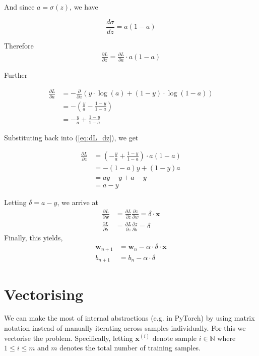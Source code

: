 \documentclass[varwidth,border=2cm]{standalone}
\begin{document}
And since $a = \sigma(z)$, we have

\begin{equation}
\frac{d\sigma}{dz} = a(1 - a) \nonumber
\end{equation}

Therefore
\begin{align}
\frac{\partial L}{\partial z} = \frac{\partial L}{\partial a} \cdot a(1-a)
\label{eq:dL_dz}
\end{align}

Further

\begin{align}
\frac{\partial L}{\partial a} &= - \frac{\partial}{\partial a} \left(y \cdot \log(a) + (1-y) \cdot \log(1-a)\right) \nonumber \\
 &= - \left( \frac{y}{a} - \frac{1-y}{1-a} \right) \nonumber \\
 &= -\frac{y}{a} + \frac{1-y}{1-a} \nonumber
\end{align}

Substituting back into (\ref{eq:dL_dz}), we get

\begin{align}
\frac{\partial L}{\partial z} &= \left( -\frac{y}{a} + \frac{1-y}{1-a} \right) \cdot a(1-a) \\
 &= -(1-a)y + (1-y)a \nonumber \\
 &= ay - y + a - y \nonumber \\
 &= a - y \nonumber 
\end{align}

Letting $\delta = a -y$, we arrive at
\begin{align}
\frac{\partial L}{\partial \bm w} &= \frac{\partial L}{\partial z} \frac{\partial z}{\partial w} = \delta\cdot\bm x \\
\frac{\partial L}{\partial b} &= \frac{\partial L}{\partial z} \frac{\partial z}{\partial b} = \delta \nonumber
\end{align}
Finally, this yields,
\begin{align}
\bm w_{n+1} &= \bm w_n - \alpha \cdot \delta \cdot \bm x \\
b_{n+1} &= b_n - \alpha \cdot \delta \nonumber
\end{align}

\section{Vectorising}
We can make the most of internal abstractions (e.g. in PyTorch) by using matrix notation instead of manually iterating across samples individually. For this we vectorise the problem. Specifically, letting $\bm x ^{(i)}$ denote sample $i \in \mathbb{N}$ where $1 \le i \le m$ and $m$ denotes the total number of training samples.
\end{document}
